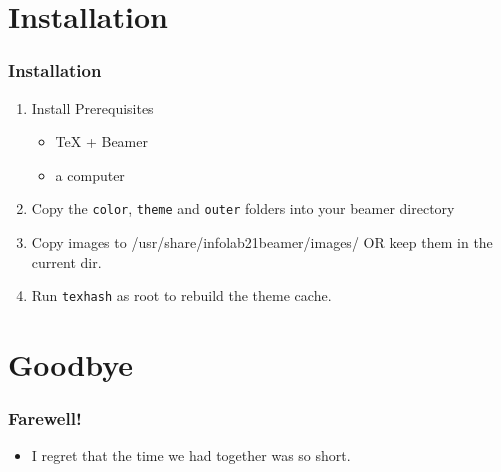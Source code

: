 \documentclass{beamer}
\begin{document}
\section{Installation}
\begin{frame}\frametitle{Installation}
\begin{enumerate}
    \item Install Prerequisites
    \begin{itemize}
	\item TeX + Beamer
	\item a computer
    \end{itemize}
    \vspace{5pt}
    \item Copy the {\tt color}, {\tt theme} and {\tt outer} folders into your beamer directory
    \vspace{5pt}
    \item Copy images to /usr/share/infolab21beamer/images/ OR keep them in the current dir.
    \vspace{5pt}
    \item Run {\tt texhash} as root to rebuild the theme cache.
\end{enumerate}
\end{frame}

\section{Goodbye}
\begin{frame}\frametitle{Farewell!}
\begin{itemize}
    \item I regret that the time we had together was so short. 
\end{itemize}
\end{frame}
\end{document}
